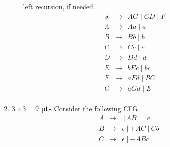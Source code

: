 \documentclass[10pt]{article}
\newcommand {\pts}[1]{{\bf #1 pts}}
\begin{document}
\begin{enumerate}
\begin{enumerate}
left recursion, if needed.
            \[\begin{array}{cll}
                S & \rightarrow & AG \mid GD \mid F \\
                A & \rightarrow & Aa \mid a \\
                B & \rightarrow & Bb \mid b \\
                C & \rightarrow & Cc \mid c \\
                D & \rightarrow & Dd \mid d \\
                E & \rightarrow & bEc \mid bc \\
                F & \rightarrow & aFd \mid BC \\
                G & \rightarrow & aGd \mid E \\
            \end{array}\]
\end{enumerate}


   \newpage
\item \pts{$3\times 3= 9$} Consider the following CFG.
\[\begin{array}{cll}
A & \rightarrow & [AB] \mid a \\
B & \rightarrow & \epsilon \mid +AC \mid Cb \\
C & \rightarrow & \epsilon \mid -ABc
\end{array}\]


\end{enumerate}
\end{document}
